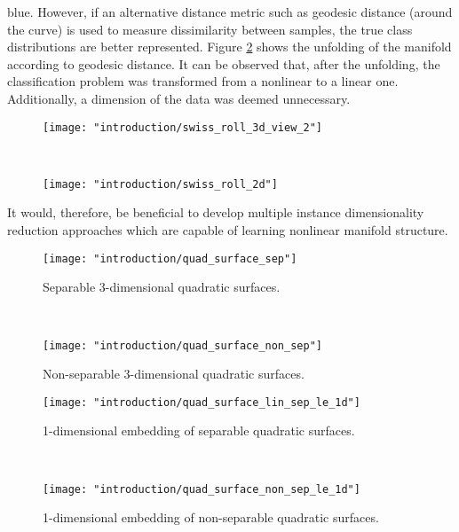 blue.  However, if an alternative distance metric such as geodesic distance (around the curve) is used to measure dissimilarity between samples, the true class distributions are better represented.  Figure \ref{fig:swiss_roll_2d} shows the unfolding of the manifold according to geodesic distance.  It can be observed that, after the unfolding, the classification problem was transformed from a nonlinear to a linear one.  Additionally, a dimension of the data was deemed unnecessary.
\begin{figure*}[t!]
	\centering
	\begin{subfigure}[t]{0.5\textwidth}
		\centering
		\texttt{[image: "introduction/swiss\_roll\_3d\_view\_2"]}
		\caption{}
		\label{fig:swiss_roll_3d}
	\end{subfigure}%
	~ 
	\begin{subfigure}[t]{0.5\textwidth}
		\centering
		\texttt{[image: "introduction/swiss\_roll\_2d"]}
		\caption{}
		\label{fig:swiss_roll_2d}
	\end{subfigure}
	\caption[Swiss Roll manifold unfolding.]{(a) This dataset is known as the Swiss Roll and it depicts a 2-dimensional manifold embedded in 3 dimensions.  (b) The Swiss Roll unfolded according to the geodesic path around the manifold.}
	\label{fig:swiss_roll}%
\end{figure*}  
It would, therefore, be beneficial to develop multiple instance dimensionality reduction approaches which are capable of learning nonlinear manifold structure.  

\begin{figure*}[h!]
	\centering
	\begin{subfigure}[t]{0.5\textwidth}
		\centering
		\texttt{[image: "introduction/quad\_surface\_sep"]}
		\caption{Separable 3-dimensional quadratic surfaces.}
		\label{fig:quad_surface_sep}
	\end{subfigure}%
	~ 
	\begin{subfigure}[t]{0.5\textwidth}
		\centering
		\texttt{[image: "introduction/quad\_surface\_non\_sep"]}
		\caption{Non-separable 3-dimensional quadratic surfaces.}
		\label{fig:quad_surface_non_sep}
	\end{subfigure}
	
	
	\begin{subfigure}[t]{0.5\textwidth}
		\centering
		\texttt{[image: "introduction/quad\_surface\_lin\_sep\_le\_1d"]}
		\caption{1-dimensional embedding of separable quadratic surfaces.}
		\label{fig:quad_surface_sep_le_1d}
	\end{subfigure}%
	~ 
	\begin{subfigure}[t]{0.5\textwidth}
		\centering
		\texttt{[image: "introduction/quad\_surface\_non\_sep\_le\_1d"]}
		\caption{1-dimensional embedding of non-separable quadratic surfaces.}
		\label{fig:quad_surface_non_sep_le_1d}
	\end{subfigure}
	\caption[Unsupervised embedding of quadratic surfaces]{Unsupervised embedding of quadratic surfaces using Laplacian Eigenmaps with a $K$-nearest neighbors graph.}
	\label{fig:quad_surfaces_no_labels}%
\end{figure*} 

